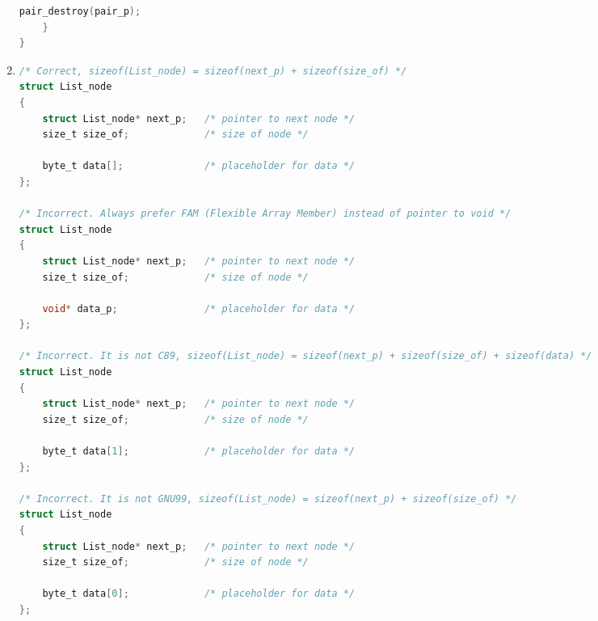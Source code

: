 \begin{enumerate}
\begin{lstlisting}[language=C,style=C99]
        pair_destroy(pair_p);
    }
}

\end{lstlisting}

    \item 
\begin{lstlisting}[language=C,style=C99]
/* Correct, sizeof(List_node) = sizeof(next_p) + sizeof(size_of) */
struct List_node
{
    struct List_node* next_p;   /* pointer to next node */
    size_t size_of;             /* size of node */

    byte_t data[];              /* placeholder for data */
};

/* Incorrect. Always prefer FAM (Flexible Array Member) instead of pointer to void */
struct List_node
{
    struct List_node* next_p;   /* pointer to next node */
    size_t size_of;             /* size of node */

    void* data_p;               /* placeholder for data */
};

/* Incorrect. It is not C89, sizeof(List_node) = sizeof(next_p) + sizeof(size_of) + sizeof(data) */
struct List_node
{
    struct List_node* next_p;   /* pointer to next node */
    size_t size_of;             /* size of node */

    byte_t data[1];             /* placeholder for data */
};

/* Incorrect. It is not GNU99, sizeof(List_node) = sizeof(next_p) + sizeof(size_of) */
struct List_node
{
    struct List_node* next_p;   /* pointer to next node */
    size_t size_of;             /* size of node */

    byte_t data[0];             /* placeholder for data */
};
\end{lstlisting}
\end{enumerate}

